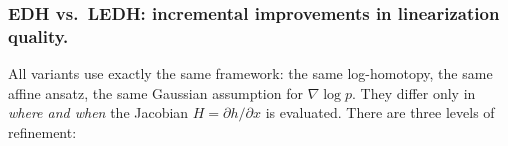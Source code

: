 \documentclass{article}
\begin{document}


\subsubsection{EDH vs.\ LEDH: incremental improvements in linearization quality.}
All variants use exactly the same framework: the same log-homotopy, the same affine ansatz, the same Gaussian assumption for $\nabla \log p$. They differ only in \textit{where and when} the Jacobian $H = \partial h / \partial x$ is evaluated. There are three levels of refinement:
\end{document}
